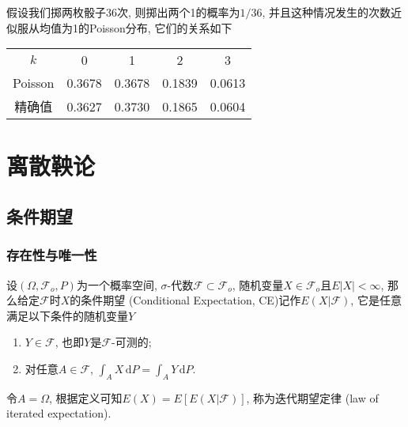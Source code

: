 \documentclass[cn, 12pt, math=mtpro2, bibstyle=apa, blue, twocol]{elegantbook}
\newcommand{\F}{\mathcal{F}}
\begin{document}
\begin{example}
假设我们掷两枚骰子36次, 则掷出两个1的概率为$1/36$, 并且这种情况发生的次数近似服从均值为1的Poisson分布, 它们的关系如下
\begin{table}[htbp!]
\centering
\begin{tabular}{ccccc}
$k$      & 0      & 1      & 2      & 3      \\
Poisson & 0.3678 & 0.3678 & 0.1839 & 0.0613 \\
精确值     & 0.3627 & 0.3730 & 0.1865 & 0.0604
\end{tabular}
\end{table}
\end{example}

\chapter{离散鞅论}
\section{条件期望}
\subsection{存在性与唯一性}
\begin{definition}\label{def:def4.1}
设$(\Omega,\F_o,P)$为一个概率空间, $\sigma$-代数$\F\subset \F_o$, 随机变量$X\in\F_o$且$E|X|<\infty$, 那么给定$\F$时$X$的条件期望 (Conditional Expectation, CE)记作$E(X|\F)$, 它是任意满足以下条件的随机变量$Y$
\begin{enumerate}[label=(\arabic*)]
  \item $Y\in\F$, 也即$Y$是$\F$-可测的;
  \item 对任意$A\in\F$, $\int_AX\,\text{d}P=\int_AY\,\text{d}P$.
\end{enumerate}
\end{definition}
\begin{remark}
令$A=\Omega$, 根据定义可知$E(X)=E[E(X|\F)]$, 称为迭代期望定律 (law of iterated expectation).
\end{remark}
\end{document}
